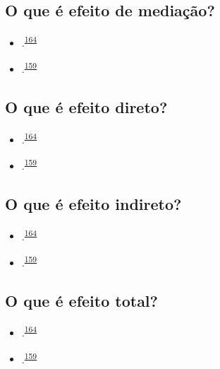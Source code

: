\documentclass[
  a4paper,
]{book}
\begin{document}
\hypertarget{o-que-uxe9-efeito-de-mediauxe7uxe3o}{%
\subsection{O que é efeito de mediação?}\label{o-que-uxe9-efeito-de-mediauxe7uxe3o}}

\begin{itemize}
\item
  .\textsuperscript{\protect\hyperlink{ref-Baron1986}{164}}
\item
  .\textsuperscript{\protect\hyperlink{ref-Bours2023}{159}}
\end{itemize}

\hypertarget{o-que-uxe9-efeito-direto}{%
\subsection{O que é efeito direto?}\label{o-que-uxe9-efeito-direto}}

\begin{itemize}
\item
  .\textsuperscript{\protect\hyperlink{ref-Baron1986}{164}}
\item
  .\textsuperscript{\protect\hyperlink{ref-Bours2023}{159}}
\end{itemize}

\hypertarget{o-que-uxe9-efeito-indireto}{%
\subsection{O que é efeito indireto?}\label{o-que-uxe9-efeito-indireto}}

\begin{itemize}
\item
  .\textsuperscript{\protect\hyperlink{ref-Baron1986}{164}}
\item
  .\textsuperscript{\protect\hyperlink{ref-Bours2023}{159}}
\end{itemize}

\hypertarget{o-que-uxe9-efeito-total}{%
\subsection{O que é efeito total?}\label{o-que-uxe9-efeito-total}}

\begin{itemize}
\item
  .\textsuperscript{\protect\hyperlink{ref-Baron1986}{164}}
\item
  .\textsuperscript{\protect\hyperlink{ref-Bours2023}{159}}
\end{itemize}
\end{document}

